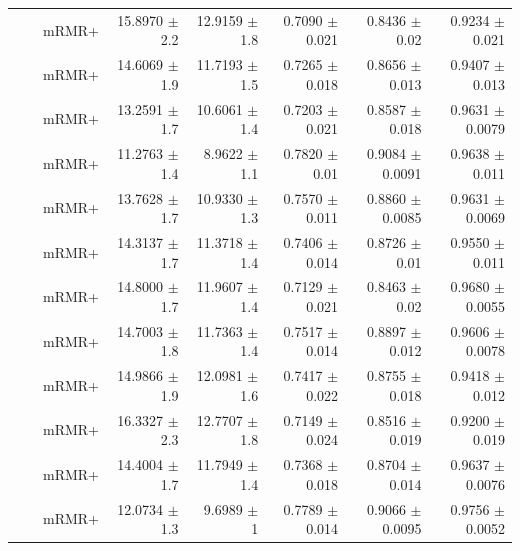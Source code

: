 \begin{longtable}{llp{}rrrrr}
 &  & mRMR+ & 15.8970 {\scriptsize $\pm$ 2.2} & 12.9159 {\scriptsize $\pm$ 1.8} & 0.7090 {\scriptsize $\pm$ 0.021} & 0.8436 {\scriptsize $\pm$ 0.02} & 0.9234 {\scriptsize $\pm$ 0.021} \\
 &  & mRMR+ & 14.6069 {\scriptsize $\pm$ 1.9} & 11.7193 {\scriptsize $\pm$ 1.5} & 0.7265 {\scriptsize $\pm$ 0.018} & 0.8656 {\scriptsize $\pm$ 0.013} & 0.9407 {\scriptsize $\pm$ 0.013} \\
 &  & mRMR+ & 13.2591 {\scriptsize $\pm$ 1.7} & 10.6061 {\scriptsize $\pm$ 1.4} & 0.7203 {\scriptsize $\pm$ 0.021} & 0.8587 {\scriptsize $\pm$ 0.018} & 0.9631 {\scriptsize $\pm$ 0.0079} \\
 &  & mRMR+ & 11.2763 {\scriptsize $\pm$ 1.4} & 8.9622 {\scriptsize $\pm$ 1.1} & 0.7820 {\scriptsize $\pm$ 0.01} & 0.9084 {\scriptsize $\pm$ 0.0091} & 0.9638 {\scriptsize $\pm$ 0.011} \\
 &  & mRMR+ & 13.7628 {\scriptsize $\pm$ 1.7} & 10.9330 {\scriptsize $\pm$ 1.3} & 0.7570 {\scriptsize $\pm$ 0.011} & 0.8860 {\scriptsize $\pm$ 0.0085} & 0.9631 {\scriptsize $\pm$ 0.0069} \\
 &  & mRMR+ & 14.3137 {\scriptsize $\pm$ 1.7} & 11.3718 {\scriptsize $\pm$ 1.4} & 0.7406 {\scriptsize $\pm$ 0.014} & 0.8726 {\scriptsize $\pm$ 0.01} & 0.9550 {\scriptsize $\pm$ 0.011} \\
 &  & mRMR+ & 14.8000 {\scriptsize $\pm$ 1.7} & 11.9607 {\scriptsize $\pm$ 1.4} & 0.7129 {\scriptsize $\pm$ 0.021} & 0.8463 {\scriptsize $\pm$ 0.02} & 0.9680 {\scriptsize $\pm$ 0.0055} \\
 &  & mRMR+ & 14.7003 {\scriptsize $\pm$ 1.8} & 11.7363 {\scriptsize $\pm$ 1.4} & 0.7517 {\scriptsize $\pm$ 0.014} & 0.8897 {\scriptsize $\pm$ 0.012} & 0.9606 {\scriptsize $\pm$ 0.0078} \\
 &  & mRMR+ & 14.9866 {\scriptsize $\pm$ 1.9} & 12.0981 {\scriptsize $\pm$ 1.6} & 0.7417 {\scriptsize $\pm$ 0.022} & 0.8755 {\scriptsize $\pm$ 0.018} & 0.9418 {\scriptsize $\pm$ 0.012} \\
 &  & mRMR+ & 16.3327 {\scriptsize $\pm$ 2.3} & 12.7707 {\scriptsize $\pm$ 1.8} & 0.7149 {\scriptsize $\pm$ 0.024} & 0.8516 {\scriptsize $\pm$ 0.019} & 0.9200 {\scriptsize $\pm$ 0.019} \\
 &  & mRMR+ & 14.4004 {\scriptsize $\pm$ 1.7} & 11.7949 {\scriptsize $\pm$ 1.4} & 0.7368 {\scriptsize $\pm$ 0.018} & 0.8704 {\scriptsize $\pm$ 0.014} & 0.9637 {\scriptsize $\pm$ 0.0076} \\
 &  & mRMR+ & 12.0734 {\scriptsize $\pm$ 1.3} & 9.6989 {\scriptsize $\pm$ 1} & 0.7789 {\scriptsize $\pm$ 0.014} & 0.9066 {\scriptsize $\pm$ 0.0095} & 0.9756 {\scriptsize $\pm$ 0.0052} \\

\end{longtable}

